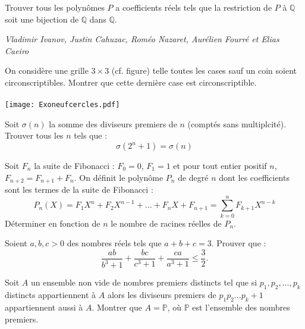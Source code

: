 \begin{exo}{}
Trouver tous les polynômes $P$ a coefficients réels tels que la restriction de $P$ à $\mathbb{Q}$ soit une bijection de $\mathbb{Q}$ dans $\mathbb{Q}$.

\medskip
\textit{Vladimir Ivanov, Justin Cahuzac, Roméo Nazaret, Aurélien Fourré et Elias Caeiro}

\end{exo}

\begin{exo}{}
On considère une grille $3\times 3$ (cf. figure) telle toutes les cases sauf un coin soient circonscriptibles. Montrer que cette dernière case est circonscriptible. \\~~\\
\texttt{[image: Exoneufcercles.pdf]}
\end{exo}


\begin{exo}{}
Soit $\sigma(n)$ la somme des diviseurs premiers de $n$ (comptés sans multiplcité). Trouver tous les $n$ tels que :
$$\sigma(2^n+1)=\sigma(n)$$
\end{exo}

\begin{exo}{}
Soit $F_n$ la suite de Fibonacci : $F_0=0$, $F_1=1$ et pour tout entier positif $n$, $F_{n+2}=F_{n+1}+F_n$.
On définit le polynôme $P_n$ de degré $n$ dont les coefficients sont les termes de la suite de Fibonacci :
$$P_n(X)= F_1X^n+F_2X^{n-1}+\ldots +F_nX+F_{n+1}=\sum_{k=0}^{n} F_{k+1}X^{n-k}$$
Déterminer en fonction de $n$ le nombre de racines réelles de $P_n$.
\end{exo}



\begin{exo}{}
Soient $a,b,c>0$ des nombres réels tels que $a+b+c=3$. Prouver que :
$$ \frac{ab}{b^{3}+1}+\frac{bc}{c^{3}+1}+\frac{ca}{a^{3}+1}\le\frac{3}{2}.$$
\end{exo}


\begin{exo}{}
Soit $A$ un ensemble non vide de nombres premiers distincts tel que si $p_1,p_2,...,p_k$ distincts appartiennent à $A$ alors les diviseurs premiers de $p_1p_2...p_k+1$ appartiennent aussi à $A$. Montrer que $A=\mathbb{P}$, où $\mathbb{P}$ est l'ensemble des nombres premiers.
\end{exo}

